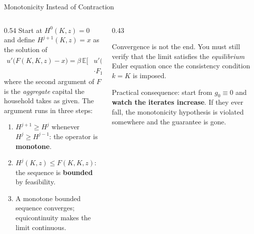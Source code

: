 \begin{frame}{Monotonicity Instead of Contraction}
\begin{columns}[T]
\begin{column}{0.54\textwidth}
\small
Start at $H^{0}(K,z)=0$ and define $H^{j+1}(K,z)=x$ as the solution of
\[
  \begin{aligned}
  u'\big(F(K,K,z)-x\big)=\beta\,\mathbb{E}\Big[&u'\big(F(x,x,z')-H^{j}(x,z')\big)\\
  &\cdot F_1(x,x,z')\Big],
  \end{aligned}
\]
where the second argument of $F$ is the \emph{aggregate} capital the household takes as given. The argument runs in three steps:
\medskip
\begin{enumerate}\footnotesize
  \item $H^{j+1}\ge H^{j}$ whenever $H^{j}\ge H^{j-1}$: the operator is \textbf{monotone}.
  \item $H^{j}(K,z)\le F(K,K,z)$: the sequence is \textbf{bounded} by feasibility.
  \item A monotone bounded sequence converges; equicontinuity makes the limit continuous.
\end{enumerate}
\end{column}
\begin{column}{0.43\textwidth}
\begin{conceptbox}[title=\textbf{Then check it is an equilibrium}]\small
Convergence is not the end. You must still verify that the limit satisfies the \emph{equilibrium} Euler equation once the consistency condition $k=K$ is imposed.
\end{conceptbox}
\medskip
\begin{examplebox}\footnotesize
Practical consequence: start from $g_0\equiv0$ and \textbf{watch the iterates increase}. If they ever fall, the monotonicity hypothesis is violated somewhere and the guarantee is gone.
\end{examplebox}
\end{column}
\end{columns}
\vspace{1mm}
\end{frame}

